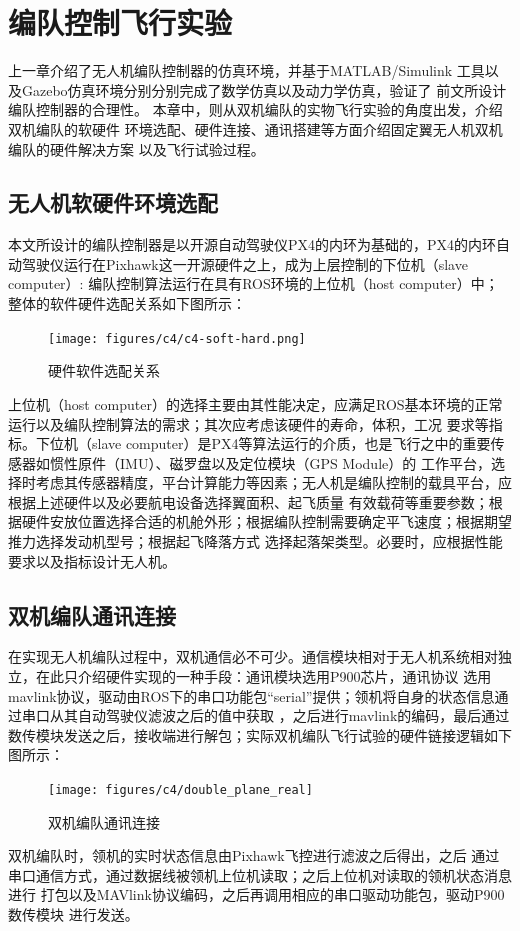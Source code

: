 \chapter{编队控制飞行实验}%
\label{chap:simulatin_expermient}
上一章介绍了无人机编队控制器的仿真环境，并基于MATLAB/Simulink
工具以及Gazebo仿真环境分别分别完成了数学仿真以及动力学仿真，验证了
前文所设计编队控制器的合理性。
本章中，则从双机编队的实物飞行实验的角度出发，介绍双机编队的软硬件
环境选配、硬件连接、通讯搭建等方面介绍固定翼无人机双机编队的硬件解决方案
以及飞行试验过程。
\section{无人机软硬件环境选配}
本文所设计的编队控制器是以开源自动驾驶仪PX4的内环为基础的，PX4的内环自动驾驶仪运行在Pixhawk这一开源硬件之上，成为上层控制的下位机（slave computer）:
编队控制算法运行在具有ROS环境的上位机（host computer）中；
整体的软件硬件选配关系如下图所示：
\begin{figure}[H]
    \centering
    \texttt{[image: figures/c4/c4-soft-hard.png]}
    \caption{硬件软件选配关系}\label{fig:c4-soft-hard.png}
\end{figure}
上位机（host computer）的选择主要由其性能决定，应满足ROS基本环境的正常运行以及编队控制算法的需求；其次应考虑该硬件的寿命，体积，工况
要求等指标。下位机（slave computer）是PX4等算法运行的介质，也是飞行之中的重要传感器如惯性原件（IMU）、磁罗盘以及定位模块（GPS Module）的
工作平台，选择时考虑其传感器精度，平台计算能力等因素；无人机是编队控制的载具平台，应根据上述硬件以及必要航电设备选择翼面积、起飞质量
有效载荷等重要参数；根据硬件安放位置选择合适的机舱外形；根据编队控制需要确定平飞速度；根据期望推力选择发动机型号；根据起飞降落方式
选择起落架类型。必要时，应根据性能要求以及指标设计无人机。
\section{双机编队通讯连接}
在实现无人机编队过程中，双机通信必不可少。通信模块相对于无人机系统相对独立，在此只介绍硬件实现的一种手段：通讯模块选用P900芯片，通讯协议
选用mavlink协议，驱动由ROS下的串口功能包“serial”提供；领机将自身的状态信息通过串口从其自动驾驶仪滤波之后的值中获取
，之后进行mavlink的编码，最后通过数传模块发送之后，接收端进行解包；实际双机编队飞行试验的硬件链接逻辑如下图所示：
\begin{figure}[H]
    \centering
    \texttt{[image: figures/c4/double\_plane\_real]}
    \caption{双机编队通讯连接}\label{fig:c4-double_plane_real}
\end{figure}
双机编队时，领机的实时状态信息由Pixhawk飞控进行滤波之后得出，之后
通过串口通信方式，通过数据线被领机上位机读取；之后上位机对读取的领机状态消息进行
打包以及MAVlink协议编码，之后再调用相应的串口驱动功能包，驱动P900数传模块
进行发送。

